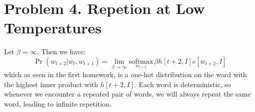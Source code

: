 \documentclass{amsart}
\theoremstyle{definition}
\begin{document}
\section*{Problem 4. Repetion at Low Temperatures}
Let $\beta = \infty$. Then we have:
\[
\Pr(w_{t + 2} | w_{t}, w_{t + 1}) = \lim_{\beta \to \infty} \underset{w_{t + 2}}{\mathrm{softmax}}\,\beta h[t + 2, I] e[w_{t + 2}, I]
\]
which as seen in the first homework, is a one-hot distribution on the word with the highest inner product with $h[t + 2, I]$.
Each word is deterministic, so whenever we encounter a repeated pair of words, we will always repeat the same word, leading to infinite repetition.
\end{document}
